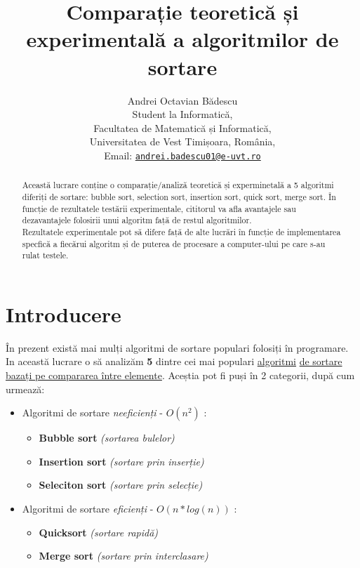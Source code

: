 \documentclass[12pt]{article}
\title{Comparație teoretică și experimentală a algoritmilor de sortare}
\author{Andrei Octavian Bădescu\\
Student la Informatică,\\
Facultatea de Matematică și Informatică,\\
Universitatea de Vest Timișoara, România,\\
Email: \href{mailto:andrei.badescu01@e-uvt.ro}{\texttt{andrei.badescu01@e-uvt.ro}}
}
\begin{document}
\maketitle
\begin{abstract}
Această lucrare conține o comparație/analiză teoretică și experminetală a 5 algoritmi diferiți de sortare: bubble sort, selection sort, insertion sort, quick sort, merge sort. În funcție de rezultatele testării experimentale, cititorul va afla avantajele sau dezavantajele folosirii unui algoritm față de restul algoritmilor.\\
\indent Rezultatele experimentale pot să difere față de alte lucrări în funcție de implementarea specfică a fiecărui algoritm și de puterea de procesare a computer-ului pe care s-au rulat testele.

\end{abstract}

\pagebreak
\tableofcontents
\listoftables
\lstlistoflistings
\pagebreak

\section{Introducere}
În prezent există mai mulți algoritmi de sortare populari folosiți în programare. In această lucrare o să analizăm \textbf{5} dintre cei mai populari \ul{algoritmi} \underline{de sortare bazați pe compararea între elemente}. Aceștia pot fi puși în 2 categorii, după cum urmează:
\begin{itemize}
\item Algoritmi de sortare \emph{neeficienți} - $O(n^2)$ :
    \begin{itemize}
    \item \textbf{Bubble sort} \emph{(sortarea bulelor)}
    \item \textbf{Insertion sort} \emph{(sortare prin inserție)}
    \item \textbf{Seleciton sort} \emph{(sortare prin selecție)}
    \end{itemize}
    
\item Algoritmi de sortare \emph{eficienți} - $O(n*log(n))$ :
    \begin{itemize}
    \item \textbf{Quicksort} \emph{(sortare rapidă)}
    \item \textbf{Merge sort} \emph{(sortare prin interclasare)}
    \end{itemize}
\end{itemize}
\end{document}

